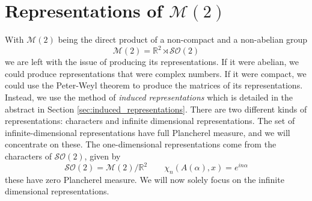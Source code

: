 \documentclass{article}
\begin{document}
\section{Representations of $\mathcal{M}(2)$} 
With $\mathcal{M}(2)$ being the direct product of a non-compact and a non-abelian group
\[ \mathcal{M}(2) = \mathbb{R}^{2} \rtimes \mathcal{SO}(2) \] 
we are left with the issue of producing its representations. If it were abelian, we could produce representations that were complex numbers. If it were compact, we could use the Peter-Weyl theorem to produce the matrices of its representations. Instead, we use the method of \textit{induced representations} which is detailed in the abstract in Section \ref{sec:induced_representations}.
There are two different kinds of representations: characters and infinite dimensional representations. The set of infinite-dimensional representations have full Plancherel measure, and we will concentrate on these. The one-dimensional representations come from the characters of $\mathcal{SO}(2)$, given by
\[%
    \mathcal{SO}(2) = \mathcal{M}(2)/\mathbb{R}^{2}
    \qquad
    \chi_{n}(A(\alpha),x) = e^{in\alpha} 
\]%
these have zero Plancherel measure. We will now solely focus on the infinite dimensional representations. 
\end{document}

